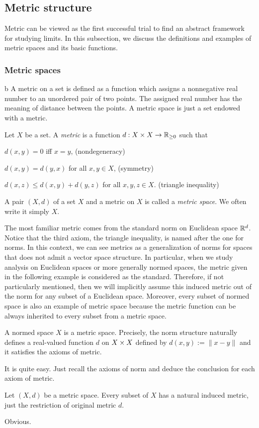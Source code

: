 \subsection{Metric structure}

Metric can be viewed as the first successful trial to find an abstract framework for studying limits.
In this subsection, we discuss the definitions and examples of metric spaces and its basic functions.

\subsubsection{Metric spaces}
b
A metric on a set is defined as a function which assigns a nonnegative real number to an unordered pair of two points.
The assigned real number has the meaning of distance between the points.
A metric space is just a set endowed with a metric.

\begin{defn}
Let $X$ be a set.
A \emph{metric} is a function $d:X\x X\to\R_{\ge0}$ such that
\begin{cond}
\item $d(x,y)=0$ iff $x=y$, \hfill(nondegeneracy)
\item $d(x,y)=d(y,x)$ for all $x,y\in X$, \hfill(symmetry)
\item $d(x,z)\le d(x,y)+d(y,z)$ for all $x,y,z\in X$. \hfill(triangle inequality)
\end{cond}
A pair $(X,d)$ of a set $X$ and a metric on $X$ is called a \emph{metric space}.
We often write it simply $X$.
\end{defn}

The most familiar metric comes from the standard norm on Euclidean space $\mathbb{R}^d$.
Notice that the third axiom, the triangle inequality, is named after the one for norms.
In this context, we can see metrics as a generalization of norms for spaces that does not admit a vector space structure.
In particular, when we study analysis on Euclidean spaces or more generally normed spaces, the metric given in the following example is considered as the standard.
Therefore, if not particularly mentioned, then we will implicitly assume this induced metric out of the norm for any subset of a Euclidean space.
Moreover, every subset of normed space is also an example of metric space because the metric function can be always inherited to every subset from a metric space.

\begin{ex}
A normed space $X$ is a metric space.
Precisely, the norm structure naturally defines a real-valued function $d$ on $X\times X$ defined by $d(x,y):=\|x-y\|$ and it satisfies the axioms of metric.
\end{ex}
\begin{pf}
It is quite easy.
Just recall the axioms of norm and deduce the conclusion for each axiom of metric.
\end{pf}
\begin{ex}
Let $(X,d)$ be a metric space.
Every subset of $X$ has a natural induced metric, just the restriction of original metric $d$.
\end{ex}
\begin{pf}
Obvious.
\end{pf}

